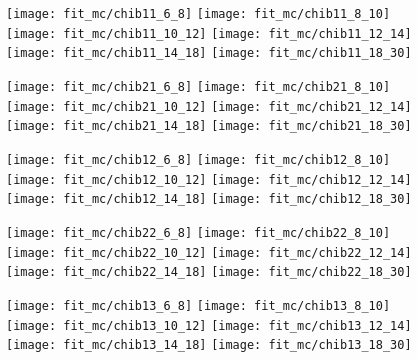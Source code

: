 \begin{figure}[ht]
\label{fig:fit_mc_chiboneOneP}
      \centering
      \texttt{[image: fit\_mc/chib11\_6\_8]}
      \texttt{[image: fit\_mc/chib11\_8\_10]}
      \texttt{[image: fit\_mc/chib11\_10\_12]}
      \texttt{[image: fit\_mc/chib11\_12\_14]}
      \texttt{[image: fit\_mc/chib11\_14\_18]}
      \texttt{[image: fit\_mc/chib11\_18\_30]}
      \caption{\chiboneOneP}
\end{figure}
\begin{figure}[ht]
      \centering
      \texttt{[image: fit\_mc/chib21\_6\_8]}
      \texttt{[image: fit\_mc/chib21\_8\_10]}
      \texttt{[image: fit\_mc/chib21\_10\_12]}
      \texttt{[image: fit\_mc/chib21\_12\_14]}
      \texttt{[image: fit\_mc/chib21\_14\_18]}
      \texttt{[image: fit\_mc/chib21\_18\_30]}
      \caption{\chibtwoOneP}
      \label{fig:fit_mc_chibtwoOneP}
\end{figure}
\begin{figure}[ht]    
      \centering
      \texttt{[image: fit\_mc/chib12\_6\_8]}
      \texttt{[image: fit\_mc/chib12\_8\_10]}
      \texttt{[image: fit\_mc/chib12\_10\_12]}
      \texttt{[image: fit\_mc/chib12\_12\_14]}
      \texttt{[image: fit\_mc/chib12\_14\_18]}
      \texttt{[image: fit\_mc/chib12\_18\_30]}
      \caption{\chiboneTwoP}
      \label{fig:fit_mc_chiboneTwoP}
\end{figure}
\begin{figure}[ht]    
      \centering
      \texttt{[image: fit\_mc/chib22\_6\_8]}
      \texttt{[image: fit\_mc/chib22\_8\_10]}
      \texttt{[image: fit\_mc/chib22\_10\_12]}
      \texttt{[image: fit\_mc/chib22\_12\_14]}
      \texttt{[image: fit\_mc/chib22\_14\_18]}
      \texttt{[image: fit\_mc/chib22\_18\_30]}
      \caption{\chibtwoTwoP}
      \label{fig:fit_mc_chibtwoTwoP}
\end{figure}
\begin{figure}[ht]    
      \centering
      \texttt{[image: fit\_mc/chib13\_6\_8]}
      \texttt{[image: fit\_mc/chib13\_8\_10]}
      \texttt{[image: fit\_mc/chib13\_10\_12]}
      \texttt{[image: fit\_mc/chib13\_12\_14]}
      \texttt{[image: fit\_mc/chib13\_14\_18]}
      \texttt{[image: fit\_mc/chib13\_18\_30]}
      \caption{\chiboneThreeP}
      \label{fig:fit_mc_chiboneThreeP}
\end{figure}

